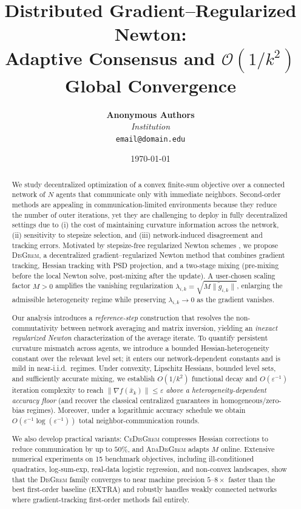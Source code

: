 \documentclass[11pt,a4paper]{article}
\title{\textbf{Distributed Gradient--Regularized Newton:\\
		Adaptive Consensus and \texorpdfstring{$\mathcal{O}(1/k^2)$}{O(1/k^2)} Global Convergence}}
\author{
	\textbf{Anonymous Authors} \\
	\textit{Institution} \\
	\texttt{email@domain.edu}
}
\date{\today}
\def\cO{O}%
\newcommand{\cO}{\mathcal{O}}
\begin{document}
	\maketitle
	
\begin{abstract}
	We study decentralized optimization of a convex finite-sum objective over a connected network
	of $N$ agents that communicate only with immediate neighbors.
	Second-order methods are appealing in communication-limited environments because they reduce
	the number of outer iterations, yet they are challenging to deploy in fully decentralized
	settings due to (i) the cost of maintaining curvature information across the network,
	(ii) sensitivity to stepsize selection, and (iii) network-induced disagreement and tracking errors.
	Motivated by stepsize-free regularized Newton schemes \citep{mishchenko2023rn},
	we propose \textsc{DisGrem}, a decentralized gradient--regularized Newton method that combines
	gradient tracking, Hessian tracking with PSD projection, and a two-stage mixing
	(pre-mixing before the local Newton solve, post-mixing after the update).
	A user-chosen scaling factor $M>0$ amplifies the vanishing regularization
	$\lambda_{i,k}=\sqrt{M\|\tilde g_{i,k}\|}$, enlarging the admissible heterogeneity regime
	while preserving $\lambda_{i,k}\to 0$ as the gradient vanishes.
	
	Our analysis introduces a \emph{reference-step} construction that resolves the
	non-commutativity between network averaging and matrix inversion, yielding an
	\emph{inexact regularized Newton} characterization of the average iterate.
	To quantify persistent curvature mismatch across agents, we introduce a bounded Hessian-heterogeneity
	constant over the relevant level set; it enters our network-dependent constants and is mild in near-i.i.d.\ regimes.
	Under convexity, Lipschitz Hessians, bounded level sets, and sufficiently accurate mixing,
	we establish $\cO(1/k^2)$ functional decay and $\cO(\varepsilon^{-1})$ iteration complexity
	to reach $\|\nabla f(\bar x_k)\|\le \varepsilon$ \emph{above a heterogeneity-dependent accuracy floor}
	(and recover the classical centralized guarantees in homogeneous/zero-bias regimes).
	Moreover, under a logarithmic accuracy schedule we obtain
	$\cO(\varepsilon^{-1}\log(\varepsilon^{-1}))$ total neighbor-communication rounds.
	
	We also develop practical variants: \textsc{CeDisGrem} compresses Hessian corrections
	to reduce communication by up to $50\%$, and \textsc{AdaDisGrem} adapts $M$ online.
	Extensive numerical experiments on 15 benchmark objectives, including ill-conditioned
	quadratics, log-sum-exp, real-data logistic regression, and non-convex landscapes,
	show that the \textsc{DisGrem} family converges to near machine precision $5$--$8\times$ faster
	than the best first-order baseline (EXTRA) and robustly handles weakly connected networks
	where gradient-tracking first-order methods fail entirely.
\end{abstract}
	
\end{document}
